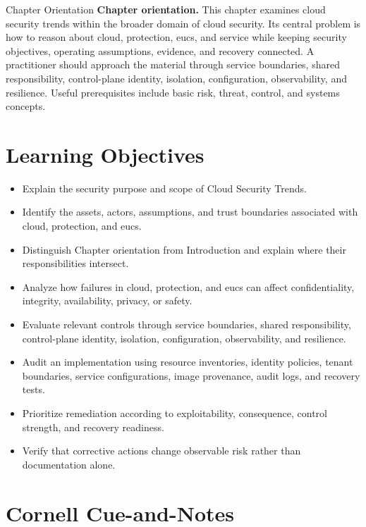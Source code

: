 \documentclass[11pt,letterpaper]{article}
\title{\CornellDocumentTitle}
\author{}
\date{}
\begin{document}
\maketitle
\begin{CornellOverviewBox}{Chapter Orientation}
\textbf{Chapter orientation.} This chapter examines cloud security trends within the broader domain of cloud security. Its central problem is how to reason about cloud, protection, eucs, and service while keeping security objectives, operating assumptions, evidence, and recovery connected. A practitioner should approach the material through service boundaries, shared responsibility, control-plane identity, isolation, configuration, observability, and resilience. Useful prerequisites include basic risk, threat, control, and systems concepts.
\end{CornellOverviewBox}
\section*{Learning Objectives}
\begin{itemize}
\item Explain the security purpose and scope of Cloud Security Trends.
\item Identify the assets, actors, assumptions, and trust boundaries associated with cloud, protection, and eucs.
\item Distinguish Chapter orientation from Introduction and explain where their responsibilities intersect.
\item Analyze how failures in cloud, protection, and eucs can affect confidentiality, integrity, availability, privacy, or safety.
\item Evaluate relevant controls through service boundaries, shared responsibility, control-plane identity, isolation, configuration, observability, and resilience.
\item Audit an implementation using resource inventories, identity policies, tenant boundaries, service configurations, image provenance, audit logs, and recovery tests.
\item Prioritize remediation according to exploitability, consequence, control strength, and recovery readiness.
\item Verify that corrective actions change observable risk rather than documentation alone.
\end{itemize}
\section*{Cornell Cue-and-Notes}
\end{document}
